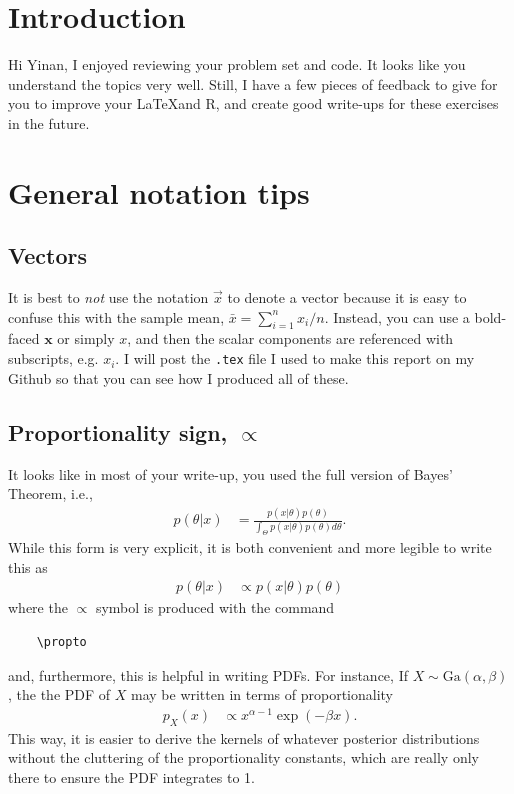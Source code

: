 \documentclass[11pt]{article}
\begin{document}
\maketitle

\setlength{\parindent}{0cm}

\section{Introduction}

Hi Yinan, I enjoyed reviewing your problem set and code. It looks like you understand the topics very well. Still, I have a few pieces of feedback to give for you to improve your \LaTeX and \textsf{R}, and create good write-ups for these exercises in the future.

\section{General notation tips}

\subsection{Vectors}

It is best to \emph{not} use the notation $\vec{x}$ to denote a vector because it is easy to confuse this with the sample mean, $\bar{x} = \sum_{i=1}^n x_i / n$. Instead, you can use a bold-faced $\mathbf{x}$ or simply $x$, and then the scalar components are referenced with subscripts, e.g. $x_i$. I will post the \texttt{.tex} file I used to make this report on my Github so that you can see how I produced all of these. 

\subsection{Proportionality sign, $\propto$}

It looks like in most of your write-up, you used the full version of Bayes' Theorem, i.e.,
%
\begin{align*}
	p(\theta | x) &= \frac{p(x|\theta)p(\theta)}{\int_\Theta p(x|\theta)p(\theta) d\theta}.
\end{align*}
%
While this form is very explicit, it is both convenient and more legible to write this as 
%
\begin{align*}
	p(\theta | x) &\propto p(x|\theta)p(\theta)
\end{align*} 
%
where the $\propto$ symbol is produced with the command \begin{verbatim}
	\propto
\end{verbatim}
%
and, furthermore, this is helpful in writing PDFs. For instance, If $X\sim \text{Ga}(\alpha, \beta)$, the the PDF of $X$ may be written in terms of proportionality 
%
\begin{align*}
	p_X(x) &\propto x^{\alpha - 1} \exp \left(-\beta x \right).
\end{align*}
% 
This way, it is easier to derive the kernels of whatever posterior distributions without the cluttering of the proportionality constants, which are really only there to ensure the PDF integrates to 1.
\end{document}
